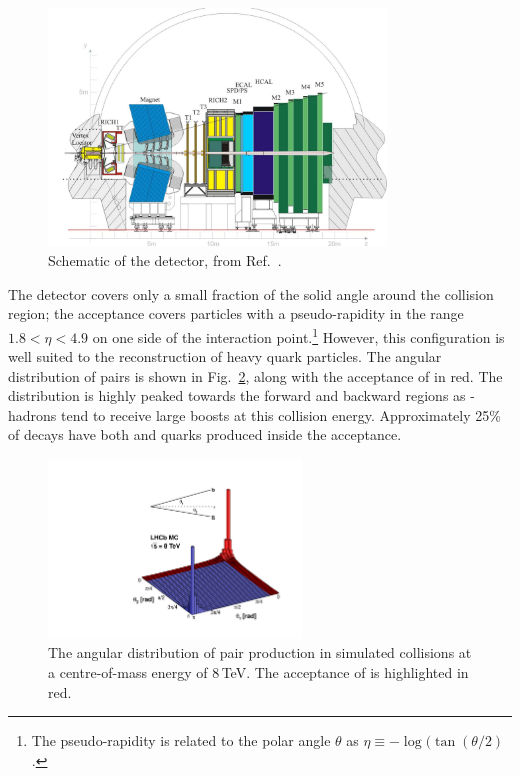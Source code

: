 \begin{figure}[!h]
    \centering
    \includegraphics[width=0.8\textwidth]{figs/Detector/LHCb_Detector_Schematic.pdf}
    \caption{Schematic of the \lhcb detector, from Ref.~\cite{Alves:2008zz}.}
    \label{fig:Dec_lhcb_Schematic}   
\end{figure}

The \lhcb detector covers only a small fraction of the solid angle around the collision region; the acceptance covers particles with a pseudo-rapidity in the range $1.8 < \eta < 4.9$ on one side of the interaction point.\footnote{The pseudo-rapidity is related to the polar angle $\theta$ as $\eta\equiv-\log(\tan{(\theta/2)}$.} However, this configuration is well suited to the reconstruction of heavy quark particles. The angular distribution of \bquark\bquarkbar pairs is shown in Fig.~\ref{fig:Dec_bb_production}, along with the acceptance of \lhcb in red. The distribution is highly peaked towards the forward and backward regions as \bquark-hadrons tend to receive large boosts at this collision energy. Approximately 25\% of decays have both \bquark and \bquarkbar quarks produced inside the acceptance.

\begin{figure}[!h]
    \centering
    \includegraphics[width=0.6\textwidth]{figs/Detector/bb_acceptance.pdf}
    \caption{The angular distribution of \bquark\bquarkbar pair production in simulated \proton \proton collisions at a centre-of-mass energy of 8\,TeV. The acceptance of \lhcb is highlighted in red.}
    \label{fig:Dec_bb_production}   
\end{figure}



